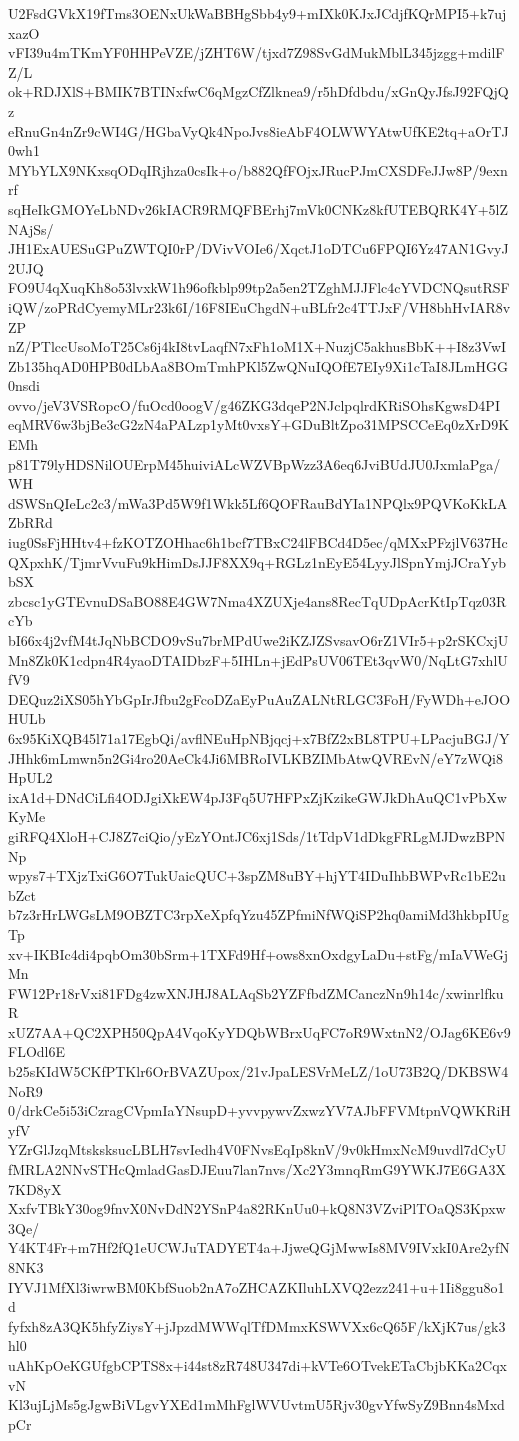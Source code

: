 U2FsdGVkX19fTms3OENxUkWaBBHgSbb4y9+mIXk0KJxJCdjfKQrMPI5+k7ujxazO
vFI39u4mTKmYF0HHPeVZE/jZHT6W/tjxd7Z98SvGdMukMblL345jzgg+mdilFZ/L
ok+RDJXlS+BMIK7BTINxfwC6qMgzCfZlknea9/r5hDfdbdu/xGnQyJfsJ92FQjQz
eRnuGn4nZr9cWI4G/HGbaVyQk4NpoJvs8ieAbF4OLWWYAtwUfKE2tq+aOrTJ0wh1
MYbYLX9NKxsqODqIRjhza0csIk+o/b882QfFOjxJRucPJmCXSDFeJJw8P/9exnrf
sqHeIkGMOYeLbNDv26kIACR9RMQFBErhj7mVk0CNKz8kfUTEBQRK4Y+5lZNAjSs/
JH1ExAUESuGPuZWTQI0rP/DVivVOIe6/XqctJ1oDTCu6FPQI6Yz47AN1GvyJ2UJQ
FO9U4qXuqKh8o53lvxkW1h96ofkblp99tp2a5en2TZghMJJFlc4cYVDCNQsutRSF
iQW/zoPRdCyemyMLr23k6I/16F8IEuChgdN+uBLfr2c4TTJxF/VH8bhHvIAR8vZP
nZ/PTlccUsoMoT25Cs6j4kI8tvLaqfN7xFh1oM1X+NuzjC5akhusBbK++I8z3VwI
Zb135hqAD0HPB0dLbAa8BOmTmhPKl5ZwQNuIQOfE7EIy9Xi1cTaI8JLmHGG0nsdi
ovvo/jeV3VSRopcO/fuOcd0oogV/g46ZKG3dqeP2NJclpqlrdKRiSOhsKgwsD4PI
eqMRV6w3bjBe3cG2zN4aPALzp1yMt0vxsY+GDuBltZpo31MPSCCeEq0zXrD9KEMh
p81T79lyHDSNilOUErpM45huiviALcWZVBpWzz3A6eq6JviBUdJU0JxmlaPga/WH
dSWSnQIeLc2c3/mWa3Pd5W9f1Wkk5Lf6QOFRauBdYIa1NPQlx9PQVKoKkLAZbRRd
iug0SsFjHHtv4+fzKOTZOHhac6h1bcf7TBxC24lFBCd4D5ec/qMXxPFzjlV637Hc
QXpxhK/TjmrVvuFu9kHimDsJJF8XX9q+RGLz1nEyE54LyyJlSpnYmjJCraYybbSX
zbcsc1yGTEvnuDSaBO88E4GW7Nma4XZUXje4ans8RecTqUDpAcrKtIpTqz03RcYb
bI66x4j2vfM4tJqNbBCDO9vSu7brMPdUwe2iKZJZSvsavO6rZ1VIr5+p2rSKCxjU
Mn8Zk0K1cdpn4R4yaoDTAIDbzF+5IHLn+jEdPsUV06TEt3qvW0/NqLtG7xhlUfV9
DEQuz2iXS05hYbGpIrJfbu2gFcoDZaEyPuAuZALNtRLGC3FoH/FyWDh+eJOOHULb
6x95KiXQB45l71a17EgbQi/avflNEuHpNBjqcj+x7BfZ2xBL8TPU+LPacjuBGJ/Y
JHhk6mLmwn5n2Gi4ro20AeCk4Ji6MBRoIVLKBZIMbAtwQVREvN/eY7zWQi8HpUL2
ixA1d+DNdCiLfi4ODJgiXkEW4pJ3Fq5U7HFPxZjKzikeGWJkDhAuQC1vPbXwKyMe
giRFQ4XloH+CJ8Z7ciQio/yEzYOntJC6xj1Sds/1tTdpV1dDkgFRLgMJDwzBPNNp
wpys7+TXjzTxiG6O7TukUaicQUC+3spZM8uBY+hjYT4IDuIhbBWPvRc1bE2ubZct
b7z3rHrLWGsLM9OBZTC3rpXeXpfqYzu45ZPfmiNfWQiSP2hq0amiMd3hkbpIUgTp
xv+IKBIc4di4pqbOm30bSrm+1TXFd9Hf+ows8xnOxdgyLaDu+stFg/mIaVWeGjMn
FW12Pr18rVxi81FDg4zwXNJHJ8ALAqSb2YZFfbdZMCanczNn9h14c/xwinrlfkuR
xUZ7AA+QC2XPH50QpA4VqoKyYDQbWBrxUqFC7oR9WxtnN2/OJag6KE6v9FLOdl6E
b25sKIdW5CKfPTKlr6OrBVAZUpox/21vJpaLESVrMeLZ/1oU73B2Q/DKBSW4NoR9
0/drkCe5i53iCzragCVpmIaYNsupD+yvvpywvZxwzYV7AJbFFVMtpnVQWKRiHyfV
YZrGlJzqMtsksksucLBLH7svIedh4V0FNvsEqIp8knV/9v0kHmxNcM9uvdl7dCyU
fMRLA2NNvSTHcQmladGasDJEuu7lan7nvs/Xc2Y3mnqRmG9YWKJ7E6GA3X7KD8yX
XxfvTBkY30og9fnvX0NvDdN2YSnP4a82RKnUu0+kQ8N3VZviPlTOaQS3Kpxw3Qe/
Y4KT4Fr+m7Hf2fQ1eUCWJuTADYET4a+JjweQGjMwwIs8MV9IVxkI0Are2yfN8NK3
IYVJ1MfXl3iwrwBM0KbfSuob2nA7oZHCAZKIluhLXVQ2ezz241+u+1Ii8ggu8o1d
fyfxh8zA3QK5hfyZiysY+jJpzdMWWqlTfDMmxKSWVXx6cQ65F/kXjK7us/gk3hl0
uAhKpOeKGUfgbCPTS8x+i44st8zR748U347di+kVTe6OTvekETaCbjbKKa2CqxvN
Kl3ujLjMs5gJgwBiVLgvYXEd1mMhFglWVUvtmU5Rjv30gvYfwSyZ9Bnn4sMxdpCr

